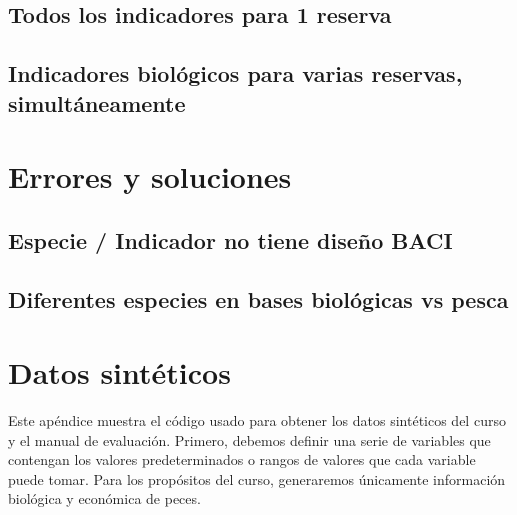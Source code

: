 \documentclass[]{krantz}
\begin{document}
\hypertarget{todos-los-indicadores-para-1-reserva}{%
\section{Todos los indicadores para 1
reserva}\label{todos-los-indicadores-para-1-reserva}}

\hypertarget{indicadores-biologicos-para-varias-reservas-simultaneamente}{%
\section{Indicadores biológicos para varias reservas,
simultáneamente}\label{indicadores-biologicos-para-varias-reservas-simultaneamente}}

\hypertarget{errores-y-soluciones}{%
\chapter{Errores y soluciones}\label{errores-y-soluciones}}

\hypertarget{especie-indicador-no-tiene-diseno-baci}{%
\section{Especie / Indicador no tiene diseño
BACI}\label{especie-indicador-no-tiene-diseno-baci}}

\hypertarget{diferentes-especies-en-bases-biologicas-vs-pesca}{%
\section{Diferentes especies en bases biológicas vs
pesca}\label{diferentes-especies-en-bases-biologicas-vs-pesca}}

\hypertarget{appendix-appendice}{%
\appendix {}}


\hypertarget{datos-sinteticos}{%
\chapter{Datos sintéticos}\label{datos-sinteticos}}

Este apéndice muestra el código usado para obtener los datos sintéticos
del curso y el manual de evaluación. Primero, debemos definir una serie
de variables que contengan los valores predeterminados o rangos de
valores que cada variable puede tomar. Para los propósitos del curso,
generaremos únicamente información biológica y económica de peces.
\end{document}
